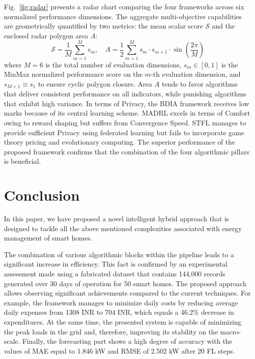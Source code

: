 \documentclass[journal]{IEEEtran}
\begin{document}
Fig.~\ref{fig:radar} presents a radar chart comparing the four frameworks across six normalized performance dimensions. The aggregate multi-objective capabilities are geometrically quantified by two metrics: the mean scalar score $\mathcal{S}$ and the enclosed radar polygon area $A$:
\begin{equation}
    \mathcal{S} = \frac{1}{M}\sum_{m=1}^{M} s_m, \quad A = \frac{1}{2}\sum_{m=1}^{M} s_m \cdot s_{m+1} \cdot \sin\left(\frac{2\pi}{M}\right)
\end{equation}
where $M = 6$ is the total number of evaluation dimensions, $s_m \in [0,1]$ is the MinMax normalized performance score on the $m$-th evaluation dimension, and $s_{M+1} \equiv s_1$ to ensure cyclic polygon closure. Area $A$ tends to favor algorithms that deliver consistent performance on all indicators, while punishing algorithms that exhibit high variance. In terms of Privacy, the BDIA framework receives low marks because of its central learning scheme. MADRL excels in terms of Comfort owing to reward shaping but suffers from Convergence Speed. STFL manages to provide sufficient Privacy using federated learning but fails to incorporate game theory pricing and evolutionary computing. The superior performance of the proposed framework confirms that the combination of the four algorithmic pillars is beneficial.

\section{Conclusion}

In this paper, we have proposed a novel intelligent hybrid approach that is designed to tackle all the above mentioned complexities associated with energy management of smart homes. 

The combination of various algorithmic blocks within the pipeline leads to a significant increase in efficiency. This fact is confirmed by an experimental assessment made using a fabricated dataset that contains 144,000 records generated over 30 days of operation for 50 smart homes. The proposed approach allows observing significant achievements compared to the current techniques. For example, the framework manages to minimize daily costs by reducing average daily expenses from 1308 INR to 704 INR, which equals a 46.2\% decrease in expenditures. At the same time, the presented system is capable of minimizing the peak loads in the grid and, therefore, improving its stability on the macro-scale. Finally, the forecasting part shows a high degree of accuracy with the values of MAE equal to 1.846 kW and RMSE of 2.502 kW after 20 FL steps.
\end{document}

